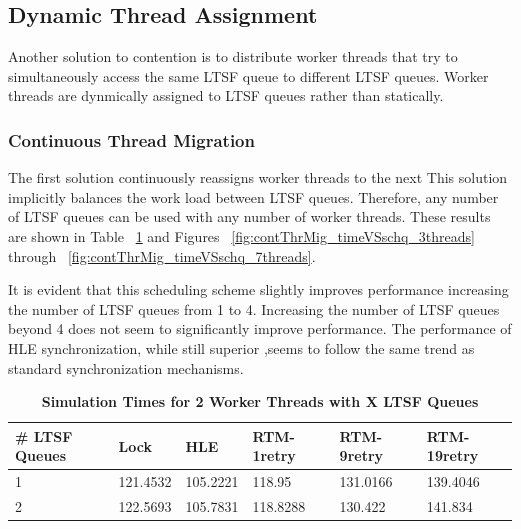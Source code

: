 \documentclass[11pt]{book}
\begin{document}
\subsection{Dynamic Thread Assignment}

Another solution to contention is to distribute worker threads that try to
simultaneously access the same LTSF queue to different LTSF queues.  Worker
threads are dynmically assigned to LTSF queues rather than statically.  

\subsubsection{Continuous Thread Migration}

The first solution continuously reassigns worker threads to the next  
This solution implicitly balances the work load between LTSF queues.  Therefore,
any number of LTSF queues can be used with any number of worker threads.  These
results are shown in Table ~\ref{tab:contThrMig_2threadsXschq} and Figures
~\ref{fig:contThrMig_timeVSschq_3threads} through
~\ref{fig:contThrMig_timeVSschq_7threads}. 

It is evident that this scheduling scheme slightly improves performance
increasing the number of LTSF queues from 1 to 4.  Increasing the number of LTSF
queues beyond 4 does not seem to significantly improve performance.  The
performance of HLE synchronization, while still superior ,seems to follow the
same trend as standard synchronization mechanisms.

\begin{table}[H]
    \centering
    \begin{tabular}{l|p{2cm}|p{2cm}|p{2cm}|p{2cm}|p{2cm}}
        \textbf{\# LTSF Queues}&Lock &HLE &RTM-1retry &RTM-9retry &RTM-19retry \\
        \hline
        \midrule
            1 &121.4532  &105.2221 &118.95   &131.0166 &139.4046 \\ 
            2 &122.5693  &105.7831 &118.8288 &130.422  &141.834  \\
    \end{tabular}
    \caption{\textbf{Simulation Times for 2 Worker Threads with X LTSF Queues}}
    \label{tab:contThrMig_2threadsXschq}
\end{table}
\end{document}
